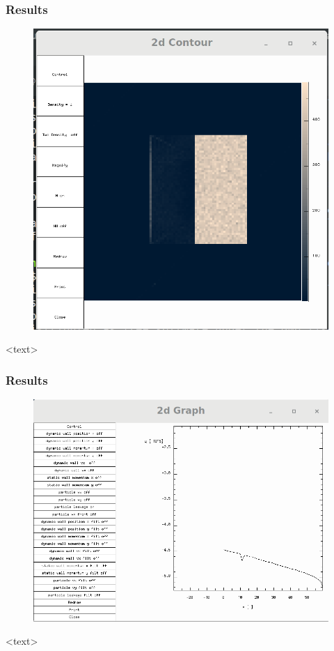 \documentclass{beamer}
\begin{document}
\begin{frame}
\frametitle{Results}
\begin{figure}
\includegraphics[scale=0.2]{A11p5}
\caption{}
\end{figure}
<text>
\end{frame}

\begin{frame}
\frametitle{Results}
\begin{figure}
\includegraphics[scale=0.2]{A11p3}
\caption{}
\end{figure}
<text>
\end{frame}
\end{document}

